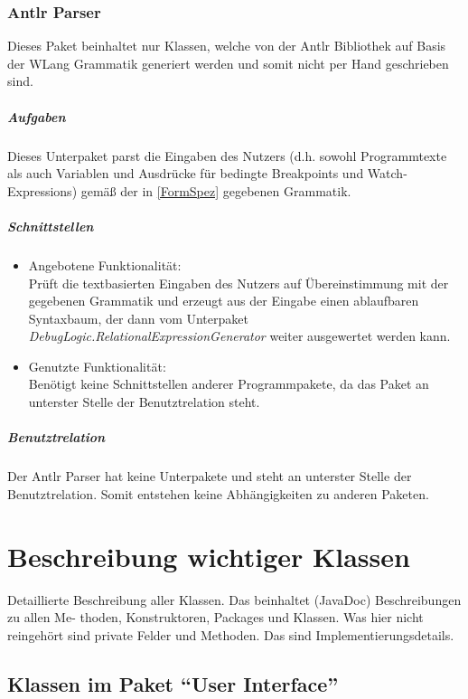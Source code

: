 \documentclass[parskip=full]{scrartcl}
\begin{document}
\subsubsection{Antlr Parser}
Dieses Paket beinhaltet nur Klassen, welche von der Antlr Bibliothek auf Basis der WLang Grammatik generiert werden und somit nicht per Hand geschrieben sind.
\subparagraph{Aufgaben}
Dieses Unterpaket parst die Eingaben des Nutzers (d.h. sowohl Programmtexte als auch Variablen und Ausdrücke für bedingte Breakpoints und Watch-Expressions) gemäß der in \ref{FormSpez} gegebenen Grammatik.

\subparagraph{Schnittstellen}
\begin{itemize}
\item Angebotene Funktionalität:\\
Prüft die textbasierten Eingaben des Nutzers auf Übereinstimmung mit der gegebenen Grammatik und erzeugt aus der Eingabe einen ablaufbaren Syntaxbaum, der dann vom Unterpaket \textit{DebugLogic.RelationalExpressionGenerator} weiter ausgewertet werden kann.
\item Genutzte Funktionalität:\\
Benötigt keine Schnittstellen anderer Programmpakete, da das Paket an unterster Stelle der Benutztrelation steht.
\end{itemize}
\subparagraph{Benutztrelation}
Der Antlr Parser hat keine Unterpakete und steht an unterster Stelle der Benutztrelation. Somit entstehen keine Abhängigkeiten zu anderen Paketen.

\section{Beschreibung wichtiger Klassen}\label{Klassen}
Detaillierte Beschreibung aller Klassen. Das beinhaltet (JavaDoc) Beschreibungen zu allen Me-
thoden, Konstruktoren, Packages und Klassen. Was hier nicht reingehört sind private Felder
und Methoden. Das sind Implementierungsdetails.

\subsection{Klassen im Paket \enquote{User Interface}}
\end{document}
